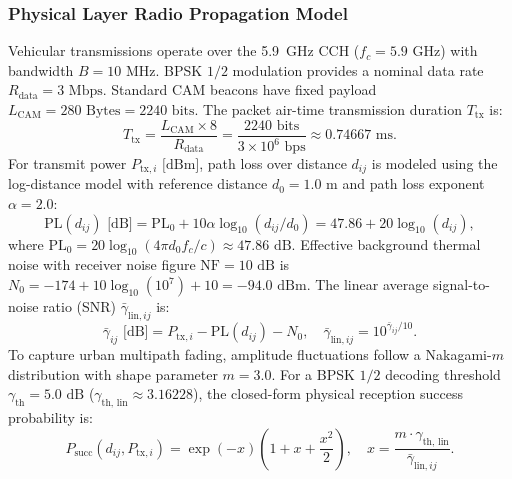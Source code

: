 \documentclass[journal]{IEEEtran}
\begin{document}
\subsubsection{Physical Layer Radio Propagation Model}
Vehicular transmissions operate over the 5.9~GHz CCH ($f_c = 5.9\text{ GHz}$) with bandwidth $B = 10\text{ MHz}$. BPSK $1/2$ modulation provides a nominal data rate $R_{\text{data}} = 3\text{ Mbps}$. Standard CAM beacons have fixed payload $L_{\text{CAM}} = 280\text{ Bytes} = 2240\text{ bits}$. The packet air-time transmission duration $T_{\text{tx}}$ is:
\begin{equation}
\label{eq:airtime}
T_{\text{tx}} = \frac{L_{\text{CAM}} \times 8}{R_{\text{data}}} = \frac{2240\text{ bits}}{3 \times 10^6\text{ bps}} \approx 0.74667\text{ ms}.
\end{equation}
For transmit power $P_{\text{tx}, i}\text{ [dBm]}$, path loss over distance $d_{ij}$ is modeled using the log-distance model with reference distance $d_0 = 1.0\text{ m}$ and path loss exponent $\alpha = 2.0$:
\begin{equation}
\label{eq:pathloss}
\text{PL}(d_{ij})\text{ [dB]} = \text{PL}_0 + 10\alpha \log_{10}(d_{ij}/d_0) = 47.86 + 20 \log_{10}(d_{ij}),
\end{equation}
where $\text{PL}_0 = 20\log_{10}(4\pi d_0 f_c / c) \approx 47.86\text{ dB}$. Effective background thermal noise with receiver noise figure $\text{NF} = 10\text{ dB}$ is $N_0 = -174 + 10\log_{10}(10^7) + 10 = -94.0\text{ dBm}$. The linear average signal-to-noise ratio (SNR) $\bar{\gamma}_{\text{lin}, ij}$ is:
\begin{equation}
\label{eq:snr}
\bar{\gamma}_{ij}\text{ [dB]} = P_{\text{tx}, i} - \text{PL}(d_{ij}) - N_0, \quad \bar{\gamma}_{\text{lin}, ij} = 10^{\bar{\gamma}_{ij}/10}.
\end{equation}
To capture urban multipath fading, amplitude fluctuations follow a Nakagami-$m$ distribution with shape parameter $m = 3.0$. For a BPSK $1/2$ decoding threshold $\gamma_{\text{th}} = 5.0\text{ dB}$ ($\gamma_{\text{th, lin}} \approx 3.16228$), the closed-form physical reception success probability is:
\begin{equation}
\label{eq:nakagami_succ}
P_{\text{succ}}(d_{ij}, P_{\text{tx}, i}) = \exp(-x) \left( 1 + x + \frac{x^2}{2} \right), \quad x = \frac{m \cdot \gamma_{\text{th, lin}}}{\bar{\gamma}_{\text{lin}, ij}}.
\end{equation}
\end{document}
